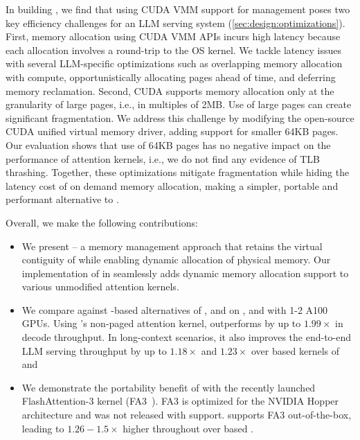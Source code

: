 In building \sysname, we find that using CUDA VMM support for \kvcache management poses two key efficiency challenges for an LLM serving system (\autoref{sec:design:optimizations}). First, memory allocation using CUDA VMM APIs incurs high latency because each allocation involves a round-trip to the OS kernel. We tackle latency issues with several LLM-specific optimizations such as overlapping memory allocation with compute, opportunistically allocating pages ahead of time, and deferring memory reclamation. Second, CUDA supports memory allocation only at the granularity of large pages, i.e., in multiples of 2MB. Use of large pages can create significant fragmentation. We address this challenge by modifying the open-source CUDA unified virtual memory driver, adding support for smaller 64KB pages. Our evaluation shows that use of 64KB pages has no negative impact on the performance of attention kernels, i.e., we do not find any evidence of TLB thrashing. Together, these optimizations mitigate fragmentation while hiding the latency cost of on demand memory allocation, making  \sysname a simpler, portable and performant alternative to \pa. 


Overall, we make the following contributions:
\begin{itemize}
\item We present \sysname{} -- a memory management approach that retains the virtual contiguity of \kvcache while enabling dynamic allocation of physical memory. Our implementation of \sysname in \vllm seamlessly adds dynamic memory allocation support to various unmodified attention kernels.


\item We compare \sysname against \pa-based alternatives of \vllm, \flashattention and \flashinfer on \yismall, \llamasmall and \yimedium with 1-2 A100 GPUs. Using \flashattention's non-paged attention kernel, \sysname outperforms \vllm by up to $1.99\times$ in decode throughput. In long-context scenarios, it also improves the end-to-end LLM serving throughput by up to $1.18\times$ and $1.23\times$ over \pa based kernels of \flashattention and \flashinfer 

\item We demonstrate the portability benefit of \sysname with the recently launched FlashAttention-3 kernel (FA3~\cite{flash-attention-3}). FA3 is optimized for the NVIDIA Hopper architecture and was not released with \pa support. \sysname supports FA3 out-of-the-box, leading to $1.26-1.5\times$ higher throughout over \pa based \flashattention.



\end{itemize}


